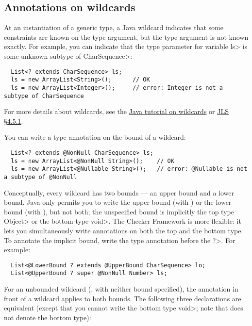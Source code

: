 \subsection{Annotations on wildcards\label{annotations-on-wildcards}}

At an instantiation of a generic type, a Java wildcard indicates that some
constraints are known on the type argument, but the type argument is not known
exactly.
For example, you can indicate that the type parameter for variable \<ls> is
some unknown subtype of \<CharSequence>:

\begin{Verbatim}
  List<? extends CharSequence> ls;
  ls = new ArrayList<String>();      // OK
  ls = new ArrayList<Integer>();     // error: Integer is not a subtype of CharSequence
\end{Verbatim}

For more details about wildcards, see the
\href{https://docs.oracle.com/javase/tutorial/java/generics/wildcards.html}{Java
  tutorial on wildcards} or
\href{https://docs.oracle.com/javase/specs/jls/se8/html/jls-4.html#jls-4.5.1}{JLS
  \S 4.5.1}.

You can write a type annotation on the bound of a wildcard:

\begin{Verbatim}
  List<? extends @NonNull CharSequence> ls;
  ls = new ArrayList<@NonNull String>();    // OK
  ls = new ArrayList<@Nullable String>();   // error: @Nullable is not a subtype of @NonNull
\end{Verbatim}

Conceptually, every wildcard has two bounds --- an upper bound and a lower
bound.  Java only permits you to write the upper bound (with
) or the lower bound (with ), but not both; the unspecified bound is implicitly the
top type
\<Object> or the bottom type \<void>.  The Checker Framework is more
flexible:  it lets you simultaneously write annotations on both the top and
the bottom type.  To annotate the implicit bound, write the type annotation
before the \<?>.  For example:

\begin{Verbatim}
  List<@LowerBound ? extends @UpperBound CharSequence> lo;
  List<@UpperBound ? super @NonNull Number> ls;
\end{Verbatim}

For an unbounded wildcard (, with neither
bound specified), the annotation in front of a wildcard applies
to both bounds.  The following three declarations are equivalent (except
that you cannot write the bottom type \<void>; note that
 does not denote the bottom type):

